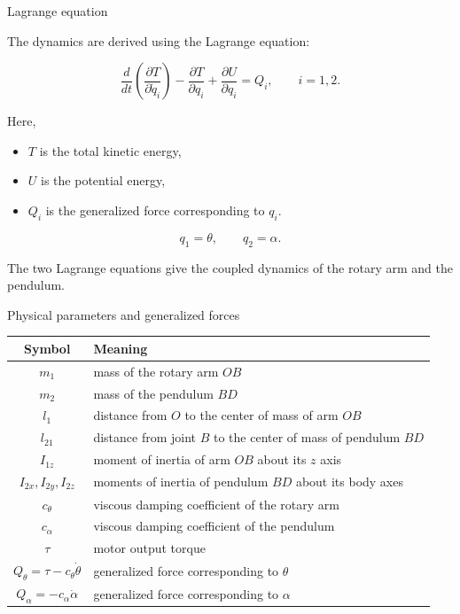 \documentclass[aspectratio=169]{beamer}
\begin{document}
\begin{frame}{Lagrange equation}

The dynamics are derived using the Lagrange equation:

\[
\frac{d}{dt}
\left(
\frac{\partial T}{\partial \dot{q}_i}
\right)
-
\frac{\partial T}{\partial q_i}
+
\frac{\partial U}{\partial q_i}
=
Q_i,
\qquad i=1,2 .
\]

\vspace{0.25cm}

Here,

\begin{itemize}
    \item $T$ is the total kinetic energy,
    \item $U$ is the potential energy,
    \item $Q_i$ is the generalized force corresponding to $q_i$.
\end{itemize}

\vspace{0.25cm}

\[
q_1=\theta,
\qquad
q_2=\alpha .
\]

The two Lagrange equations give the coupled dynamics of the rotary arm and the pendulum.

\end{frame}




\begin{frame}{Physical parameters and generalized forces}

\begin{center}
\renewcommand{\arraystretch}{1.18}
\begin{tabular}{c l}
\hline
Symbol & Meaning \\
\hline
$m_1$ & mass of the rotary arm $OB$ \\
$m_2$ & mass of the pendulum $BD$ \\
$l_1$ & distance from $O$ to the center of mass of arm $OB$ \\
$l_{21}$ & distance from joint $B$ to the center of mass of pendulum $BD$ \\
$I_{1z}$ & moment of inertia of arm $OB$ about its $z$ axis \\
$I_{2x}, I_{2y}, I_{2z}$ & moments of inertia of pendulum $BD$ about its body axes \\
$c_\theta$ & viscous damping coefficient of the rotary arm \\
$c_\alpha$ & viscous damping coefficient of the pendulum \\
$\tau$ & motor output torque \\
\hline
$Q_\theta = \tau - c_\theta \dot{\theta}$ & generalized force corresponding to $\theta$ \\
$Q_\alpha = -c_\alpha \dot{\alpha}$ & generalized force corresponding to $\alpha$ \\
\hline
\end{tabular}
\end{center}


\end{frame}
\end{document}
